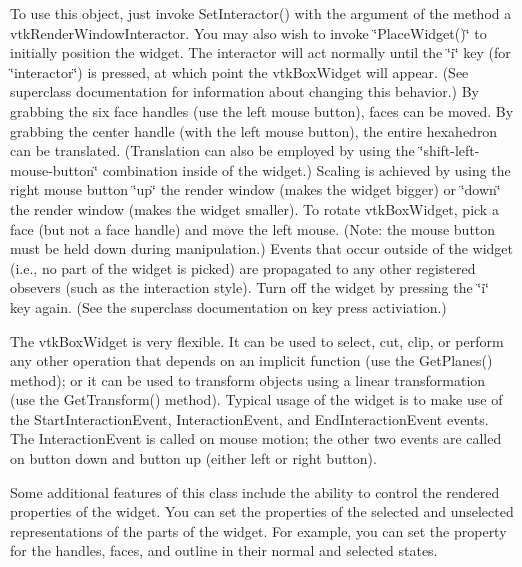 To use this object, just invoke Set\-Interactor() with the argument of the method a vtk\-Render\-Window\-Interactor. You may also wish to invoke \char`\"{}\-Place\-Widget()\char`\"{} to initially position the widget. The interactor will act normally until the \char`\"{}i\char`\"{} key (for \char`\"{}interactor\char`\"{}) is pressed, at which point the vtk\-Box\-Widget will appear. (See superclass documentation for information about changing this behavior.) By grabbing the six face handles (use the left mouse button), faces can be moved. By grabbing the center handle (with the left mouse button), the entire hexahedron can be translated. (Translation can also be employed by using the \char`\"{}shift-\/left-\/mouse-\/button\char`\"{} combination inside of the widget.) Scaling is achieved by using the right mouse button \char`\"{}up\char`\"{} the render window (makes the widget bigger) or \char`\"{}down\char`\"{} the render window (makes the widget smaller). To rotate vtk\-Box\-Widget, pick a face (but not a face handle) and move the left mouse. (Note\-: the mouse button must be held down during manipulation.) Events that occur outside of the widget (i.\-e., no part of the widget is picked) are propagated to any other registered obsevers (such as the interaction style). Turn off the widget by pressing the \char`\"{}i\char`\"{} key again. (See the superclass documentation on key press activiation.)

The vtk\-Box\-Widget is very flexible. It can be used to select, cut, clip, or perform any other operation that depends on an implicit function (use the Get\-Planes() method); or it can be used to transform objects using a linear transformation (use the Get\-Transform() method). Typical usage of the widget is to make use of the Start\-Interaction\-Event, Interaction\-Event, and End\-Interaction\-Event events. The Interaction\-Event is called on mouse motion; the other two events are called on button down and button up (either left or right button).

Some additional features of this class include the ability to control the rendered properties of the widget. You can set the properties of the selected and unselected representations of the parts of the widget. For example, you can set the property for the handles, faces, and outline in their normal and selected states.

